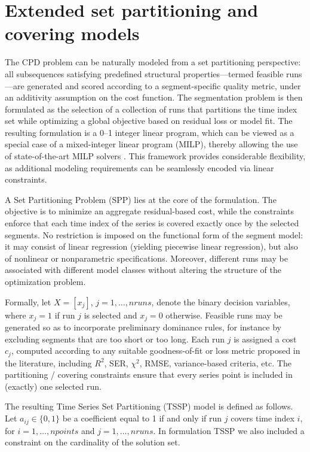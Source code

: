 \documentclass[preprints,article,submit,pdftex,moreauthors]{Definitions/mdpi}
\begin{document}
\section{Extended set partitioning and covering models}  \label{sec:SCPmodel}
The CPD problem can be naturally modeled from a set partitioning perspective: all subsequences satisfying predefined structural properties—termed feasible runs—are generated and scored according to a segment-specific quality metric, under an additivity assumption on the cost function. The segmentation problem is then formulated as the selection of a collection of runs that partitions the time index set while optimizing a global objective based on residual loss or model fit. The resulting formulation is a 0–1 integer linear program, which can be viewed as a special case of a mixed-integer linear program (MILP), thereby allowing the use of state-of-the-art MILP solvers \cite{FLS09}. This framework provides considerable flexibility, as additional modeling requirements can be seamlessly encoded via linear constraints.

A Set Partitioning Problem (SPP) lies at the core of the formulation. The objective is to minimize an aggregate residual-based cost, while the constraints enforce that each time index of the series is covered exactly once by the selected segments. No restriction is imposed on the functional form of the segment model: it may consist of linear regression (yielding piecewise linear regression), but also of nonlinear or nonparametric specifications. Moreover, different runs may be associated with different model classes without altering the structure of the optimization problem.

Formally, let $X = [x_j]$, $j = 1,\ldots,nruns$, denote the binary decision variables, where $x_j = 1$ if run $j$ is selected and $x_j = 0$ otherwise. Feasible runs may be generated so as to incorporate preliminary dominance rules, for instance by excluding segments that are too short or too long. Each run $j$ is assigned a cost $c_j$, computed according to any suitable goodness-of-fit or loss metric proposed in the literature, including $R^2$, SER, $\chi^2$, RMSE, variance-based criteria, etc. The partitioning / covering constraints ensure that every series point is included in (exactly) one selected run.

The resulting Time Series Set Partitioning (TSSP) model is defined as follows. Let $a_{ij} \in \{0,1\}$ be a coefficient equal to 1 if and only if run $j$ covers time index $i$, for $i = 1,\ldots,npoints$ and $j = 1,\ldots,nruns$. In formulation TSSP we also included a constraint on the cardinality of the solution set.
\end{document}

